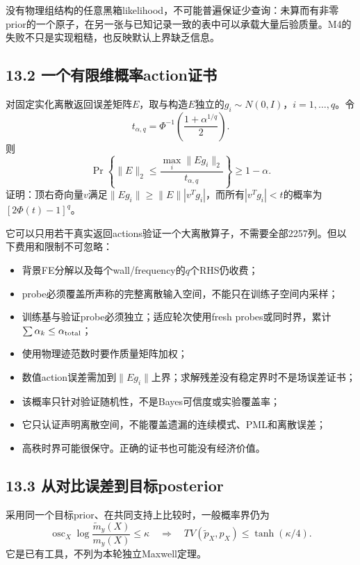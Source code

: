 \documentclass[
  10pt,
  a4paper,
]{article}
\providecommand{\tightlist}{%
  \setlength{\itemsep}{0pt}\setlength{\parskip}{0pt}}
\providecommand{\tightlist}{\setlength{\itemsep}{1pt}\setlength{\parskip}{1pt}}
\begin{document}
没有物理组结构的任意黑箱likelihood，不可能普遍保证少查询：未算而有非零prior的一个原子，在另一张与已知记录一致的表中可以承载大量后验质量。M4的失败不只是实现粗糙，也反映默认上界缺乏信息。

\hypertarget{ux4e00ux4e2aux6709ux9650ux7ef4ux6982ux7387actionux8bc1ux4e66}{%
\subsection{13.2
一个有限维概率action证书}\label{ux4e00ux4e2aux6709ux9650ux7ef4ux6982ux7387actionux8bc1ux4e66}}

对固定实化离散返回误差矩阵\(E\)，取与构造\(E\)独立的\(g_i\sim N(0,I)\)，\(i=1,\dots,q\)。令
\[
t_{\alpha,q}=\Phi^{-1}\left(\frac{1+\alpha^{1/q}}2\right).
\] 则 \[
\boxed{
\Pr\left\{\|E\|_2
\le\frac{\max_i\|Eg_i\|_2}{t_{\alpha,q}}\right\}\ge1-\alpha.
}
\]
证明：顶右奇向量\(v\)满足\(\|Eg_i\|\ge\|E\||v^Tg_i|\)，而所有\(|v^Tg_i|<t\)的概率为\([2\Phi(t)-1]^q\)。

它可以只用若干真实返回actions验证一个大离散算子，不需要全部2257列。但以下费用和限制不可忽略：

\begin{itemize}
\tightlist
\item
  背景FE分解以及每个wall/frequency的\(q\)个RHS仍收费；
\item
  probe必须覆盖所声称的完整离散输入空间，不能只在训练子空间内采样；
\item
  训练基与验证probe必须独立；适应轮次使用fresh
  probes或同时界，累计\(\sum\alpha_k\le\alpha_{\rm total}\)；
\item
  使用物理迹范数时要作质量矩阵加权；
\item
  数值action误差需加到\(\|Eg_i\|\)上界；求解残差没有稳定界时不是场误差证书；
\item
  该概率只针对验证随机性，不是Bayes可信度或实验覆盖率；
\item
  它只认证声明离散空间，不能覆盖遗漏的连续模式、PML和离散误差；
\item
  高秩时界可能很保守。正确的证书也可能没有经济价值。
\end{itemize}

\hypertarget{ux4eceux5bf9ux6bd4ux8befux5deeux5230ux76eeux6807posterior}{%
\subsection{13.3
从对比误差到目标posterior}\label{ux4eceux5bf9ux6bd4ux8befux5deeux5230ux76eeux6807posterior}}

采用同一个目标prior、在共同支持上比较时，一般概率界仍为 \[
\operatorname{osc}_X\log\frac{\widetilde m_y(X)}{m_y(X)}
\le\kappa
\quad\Longrightarrow\quad
TV(\widetilde p_X,p_X)\le\tanh(\kappa/4).
\] 它是已有工具，不列为本轮独立Maxwell定理。
\end{document}
